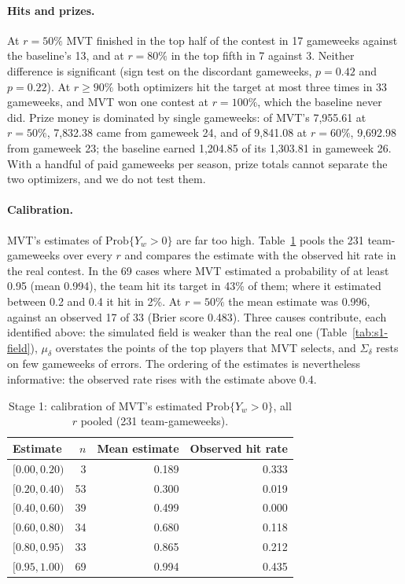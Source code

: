 \documentclass[12pt,oneside,a4paper]{book}
\theoremstyle{definition}
\theoremstyle{remark}
\begin{document}
	\paragraph{Hits and prizes.} At $r=50\%$ MVT finished in the top half of the contest in 17
	gameweeks against the baseline's 13, and at $r=80\%$ in the top fifth in 7 against 3. Neither
	difference is significant (sign test on the discordant gameweeks, $p=0.42$ and $p=0.22$). At
	$r\ge 90\%$ both optimizers hit the target at most three times in 33 gameweeks, and MVT won one
	contest at $r=100\%$, which the baseline never did. Prize money is dominated by single
	gameweeks: of MVT's 7{,}955.61 at $r=50\%$, 7{,}832.38 came from gameweek 24, and of 9{,}841.08 at
	$r=60\%$, 9{,}692.98 from gameweek 23; the baseline earned 1{,}204.85 of its 1{,}303.81 in
	gameweek 26. With a handful of paid gameweeks per season, prize totals cannot separate the two
	optimizers, and we do not test them.

	\paragraph{Calibration.} MVT's estimates of $\mathrm{Prob}\{Y_w>0\}$ are far too high.
	Table~\ref{tab:s1-calibration} pools the 231 team-gameweeks over every $r$ and compares the
	estimate with the observed hit rate in the real contest. In the 69 cases where MVT estimated a
	probability of at least 0.95 (mean 0.994), the team hit its target in 43\% of them; where it
	estimated between 0.2 and 0.4 it hit in 2\%. At $r=50\%$ the mean estimate was 0.996, against an
	observed 17 of 33 (Brier score 0.483). Three causes contribute, each identified above: the
	simulated field is weaker than the real one (Table~\ref{tab:s1-field}), $\mu_\delta$ overstates
	the points of the top players that MVT selects, and $\Sigma_\delta$ rests on few gameweeks of
	errors. The ordering of the estimates is nevertheless informative: the observed rate rises
	with the estimate above 0.4.

	\begin{table}[ht]
		\centering
		\caption{Stage 1: calibration of MVT's estimated $\mathrm{Prob}\{Y_w>0\}$, all $r$ pooled
			(231 team-gameweeks).}
		\label{tab:s1-calibration}
		\begin{tabular}{lrrr}
			\toprule
			Estimate & $n$ & Mean estimate & Observed hit rate \\
			\midrule
			$[0.00, 0.20)$ & 3  & 0.189 & 0.333 \\
			$[0.20, 0.40)$ & 53 & 0.300 & 0.019 \\
			$[0.40, 0.60)$ & 39 & 0.499 & 0.000 \\
			$[0.60, 0.80)$ & 34 & 0.680 & 0.118 \\
			$[0.80, 0.95)$ & 33 & 0.865 & 0.212 \\
			$[0.95, 1.00)$ & 69 & 0.994 & 0.435 \\
			\bottomrule
		\end{tabular}
	\end{table}
\end{document}
